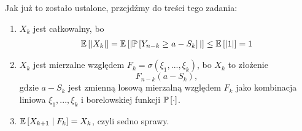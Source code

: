 \documentclass{article}
\begin{document}
Jak już to zostało ustalone, przejdźmy do treści tego zadania:
\begin{enumerate}
  \item $X_k$ jest całkowalny, bo
    \begin{align*}
      \expected{|X_k|}=\expected{|\prob{Y_{n-k}\geq a-S_k}|}\leq \expected{|1|}=1
    \end{align*}
  \item $X_k$ jest mierzalne względem $F_k=\sigma(\xi_1,...,\xi_k)$, bo $X_k$ to złożenie
    $$F_{n-k}(a-S_k),$$
    gdzie $a-S_k$ jest zmienną losową mierzalną względem $F_k$ jako kombinacja liniowa $\xi_1,...,\xi_k$ i borelowskiej funkcji $\prob{\cdot}$.


  \item $\expected{X_{k+1}}{F_k}=X_k$, czyli sedno sprawy.


\end{enumerate}
\end{document}
